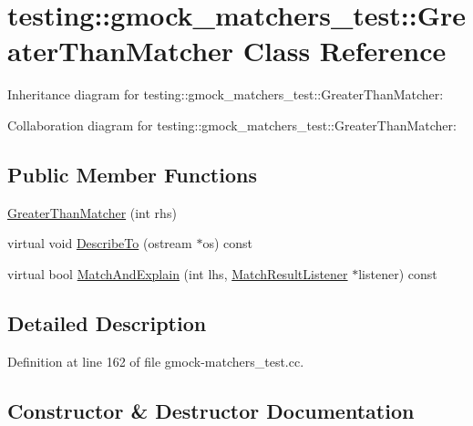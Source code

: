 \hypertarget{classtesting_1_1gmock__matchers__test_1_1_greater_than_matcher}{}\section{testing\+:\+:gmock\+\_\+matchers\+\_\+test\+:\+:Greater\+Than\+Matcher Class Reference}
\label{classtesting_1_1gmock__matchers__test_1_1_greater_than_matcher}


Inheritance diagram for testing\+:\+:gmock\+\_\+matchers\+\_\+test\+:\+:Greater\+Than\+Matcher\+:


Collaboration diagram for testing\+:\+:gmock\+\_\+matchers\+\_\+test\+:\+:Greater\+Than\+Matcher\+:
\subsection*{Public Member Functions}
\begin{DoxyCompactItemize}
\item 
\hyperlink{classtesting_1_1gmock__matchers__test_1_1_greater_than_matcher_a605c50137599a1dba0701bbd735bf1e8}{Greater\+Than\+Matcher} (int rhs)
\item 
virtual void \hyperlink{classtesting_1_1gmock__matchers__test_1_1_greater_than_matcher_a92cf6ff96d14a4c183961ae3ce848f37}{Describe\+To} (ostream $\ast$os) const 
\item 
virtual bool \hyperlink{classtesting_1_1gmock__matchers__test_1_1_greater_than_matcher_a2e7f2d786f9e202f40ea3317f29261db}{Match\+And\+Explain} (int lhs, \hyperlink{classtesting_1_1_match_result_listener}{Match\+Result\+Listener} $\ast$listener) const 
\end{DoxyCompactItemize}


\subsection{Detailed Description}


Definition at line 162 of file gmock-\/matchers\+\_\+test.\+cc.



\subsection{Constructor \& Destructor Documentation}
